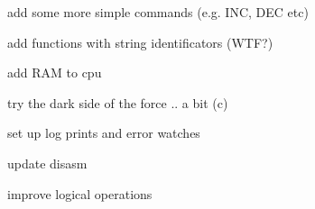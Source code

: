 
\begin{DoxyRefList}
\item[\label{todo__todo000001}%
\hypertarget{todo__todo000001}{}%
page \hyperlink{index}{Main Page} ]
\begin{DoxyItemize}
\item add some more simple commands (e.\-g. I\-N\-C, D\-E\-C etc)
\item add functions with string identificators (W\-T\-F?)
\item add R\-A\-M to cpu
\item try the dark side of the force .. a bit (c)
\item set up log prints and error watches
\item update disasm
\item improve logical operations 
\end{DoxyItemize}
\end{DoxyRefList}